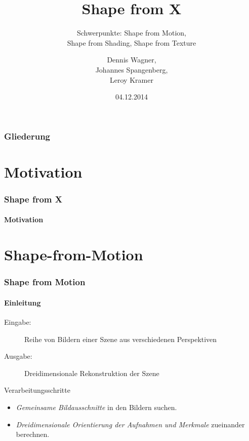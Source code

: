 \documentclass{beamer}
\title{Shape from X}
\subtitle{Schwerpunkte: Shape from Motion, \\ Shape from Shading, Shape from Texture}
\author{Dennis Wagner, \\ Johannes Spangenberg, \\ Leroy Kramer}
\date{04.12.2014}
\begin{document}
\begin{acronym}[SIFT]
\end{acronym}


\frame{\titlepage} 


\begin{frame}
	\frametitle{Gliederung}
	\tableofcontents
\end{frame} 


\section{Motivation} 
\begin{frame}
	\frametitle{Shape from X}
	\framesubtitle{Motivation}
\end{frame}


\section{Shape-from-Motion}
\begin{frame}
	\frametitle{Shape from Motion}
	\framesubtitle{Einleitung}

	\begin{description}
		\item[Eingabe:] Reihe von Bildern einer Szene aus verschiedenen Perspektiven
		\item[Ausgabe:] Dreidimensionale Rekonstruktion der Szene
	\end{description}

	\begin{block}{Verarbeitungsschritte}
		\begin{itemize}
			\item \emph{Gemeinsame Bildausschnitte} in den Bildern suchen.
			\item \emph{Dreidimensionale Orientierung der Aufnahmen und Merkmale} zueinander berechnen.
		\end{itemize}
	\end{block}
\end{frame}
\end{document}

